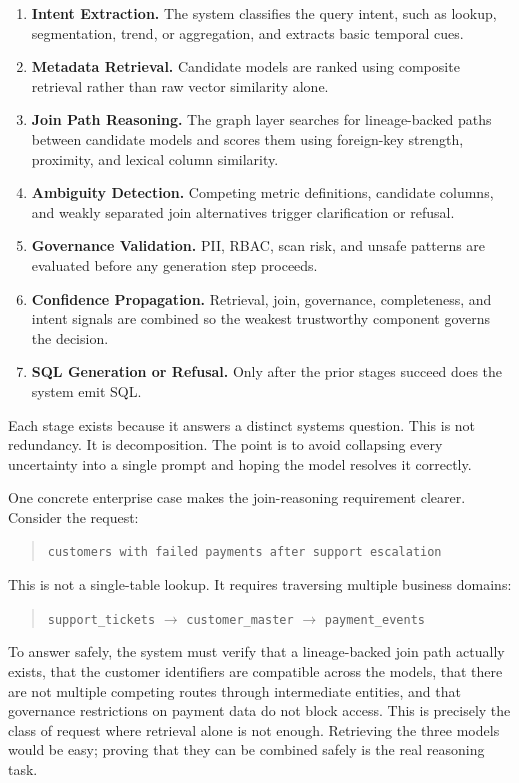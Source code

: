 \documentclass[11pt]{article}
\begin{document}
\begin{enumerate}[leftmargin=1.5em]
  \item \textbf{Intent Extraction.} The system classifies the query intent, such as lookup, segmentation, trend, or aggregation, and extracts basic temporal cues.
  \item \textbf{Metadata Retrieval.} Candidate models are ranked using composite retrieval rather than raw vector similarity alone.
  \item \textbf{Join Path Reasoning.} The graph layer searches for lineage-backed paths between candidate models and scores them using foreign-key strength, proximity, and lexical column similarity.
  \item \textbf{Ambiguity Detection.} Competing metric definitions, candidate columns, and weakly separated join alternatives trigger clarification or refusal.
  \item \textbf{Governance Validation.} PII, RBAC, scan risk, and unsafe patterns are evaluated before any generation step proceeds.
  \item \textbf{Confidence Propagation.} Retrieval, join, governance, completeness, and intent signals are combined so the weakest trustworthy component governs the decision.
  \item \textbf{SQL Generation or Refusal.} Only after the prior stages succeed does the system emit SQL.
\end{enumerate}

Each stage exists because it answers a distinct systems question. This is not redundancy. It is decomposition. The point is to avoid collapsing every uncertainty into a single prompt and hoping the model resolves it correctly.

One concrete enterprise case makes the join-reasoning requirement clearer. Consider the request:

\begin{quote}
\texttt{customers with failed payments after support escalation}
\end{quote}

This is not a single-table lookup. It requires traversing multiple business domains:

\begin{quote}
\texttt{support\_tickets} $\rightarrow$ \texttt{customer\_master} $\rightarrow$ \texttt{payment\_events}
\end{quote}

To answer safely, the system must verify that a lineage-backed join path actually exists, that the customer identifiers are compatible across the models, that there are not multiple competing routes through intermediate entities, and that governance restrictions on payment data do not block access. This is precisely the class of request where retrieval alone is not enough. Retrieving the three models would be easy; proving that they can be combined safely is the real reasoning task.
\end{document}
